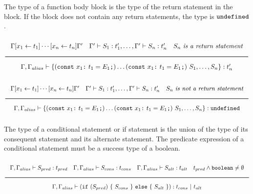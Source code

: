 The type of a function body block is the type of the return statement in the block.
If the block does not contain any return statements, the type is $\texttt{undefined}$.

\noindent
\[
  \Rule{\Gamma [x_1 \leftarrow t_1] \cdots [x_n \leftarrow t_n] \Gamma' \quad
    \Gamma' \vdash S_1 : t'_1, \ldots, \Gamma' \vdash S_n : t'_n \quad S_n\ \textit{is a return statement}}{
    \Gamma, \Gamma_{alias} \vdash \{ (\texttt{const}\ x_1 \texttt{:}\ t_1 = E_1\texttt{;}) \ldots (\texttt{const}\ x_1 \texttt{:}\ t_1 = E_1\texttt{;})\
    S_1, \ldots, S_n\} : t'_n}
\]
\noindent
\[
  \Rule{\Gamma [x_1 \leftarrow t_1] \cdots [x_n \leftarrow t_n] \Gamma' \quad
    \Gamma' \vdash S_1 : t'_1, \ldots, \Gamma' \vdash S_n : t'_n \quad S_n\ \textit{is not a return statement}}{
    \Gamma, \Gamma_{alias} \vdash \{ (\texttt{const}\ x_1 \texttt{:}\ t_1 = E_1\texttt{;}) \ldots (\texttt{const}\ x_1 \texttt{:}\ t_1 = E_1\texttt{;})\
    S_1, \ldots, S_n\} : \Undefined}
\]
\noindent

The type of a conditional statement or if statement is the union of the type of its consequent statement and its alternate statement.
The predicate expression of a conditional statement must be a success type of a boolean.

\noindent
\[
  \Rule{\Gamma, \Gamma_{alias} \vdash S_{pred} : t_{pred} \quad \Gamma, \Gamma_{alias} \vdash S_{cons} : t_{cons} \quad \Gamma, \Gamma_{alias} \vdash S_{alt} : t_{alt}
    \quad t_{pred} \wedge \Bool \neq \emptyset}{\Gamma, \Gamma_{alias} \vdash (\texttt{if}\ (S_{pred})\ \{\ S_{cons}\ \}\
    \texttt{else}\ \{\ S_{alt}\ \}) : t_{cons}\ |\ t_{alt}}
\]
\noindent
